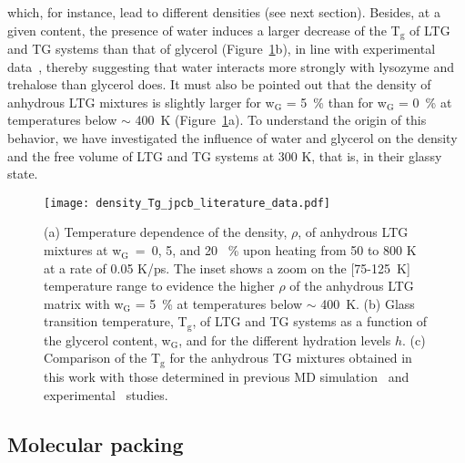 \documentclass[journal=jpcbfk,manuscript=article]{achemso}
\begin{document}
\begin{singlespacing}
which, for instance, lead to different densities (see next section). 
Besides, at a given content, the presence of water induces a larger decrease of the T$_{\textrm{g}}$ of LTG and TG systems 
than that of glycerol (Figure~\ref{density_glass_transition}b), in line with experimental data~\cite{Chen2000,Cicerone2004,Weng2015}, thereby 
suggesting that water interacts more strongly with lysozyme and trehalose than glycerol does. 
It must also be pointed out that the density of anhydrous LTG mixtures is slightly larger for w$_{\textrm{G}}$ = 5~\% than for w$_{\textrm{G}}$ = 0~\%
at temperatures below $\sim$ 400~K (Figure~\ref{density_glass_transition}a). To understand the origin of this behavior, we have investigated
the influence of water and glycerol on the density and the free volume of LTG and TG systems at 300 K, that is, in their glassy state.

\begin{figure}[htbp]
\texttt{[image: density\_Tg\_jpcb\_literature\_data.pdf]}
\caption{\label{density_glass_transition}
(a) Temperature dependence of the density, $\rho$, of anhydrous LTG mixtures at w$_{\textrm{G}}$~=~0, 5, and 20 ~\% upon 
heating from 50 to 800 K at a rate of 0.05 K/ps. The inset shows a zoom on the [75-125~K] temperature range to evidence
the higher $\rho$ of the anhydrous LTG matrix with w$_{\textrm{G}}$ = 5~\% at temperatures below $\sim$ 400~K. 
(b) Glass transition temperature, T$_{\textrm{g}}$, of LTG and TG systems 
as a function of the glycerol content, w$_{\textrm{G}}$, and for the different hydration levels $h$. 
(c) Comparison of the T$_{\textrm{g}}$ for the anhydrous TG mixtures obtained in this work with those determined 
in previous MD simulation~\cite{Dirama2005,Riggleman2008,Averett2012} and experimental~\cite{Cicerone2004,Weng2015} studies.}
\end{figure}

\newpage
\subsection{Molecular packing}


\end{singlespacing}
\end{document}
